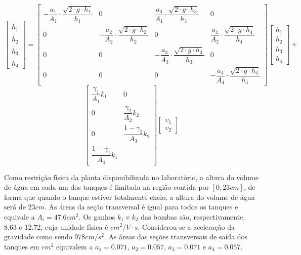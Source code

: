 \begin{example}
\begin{equation*}
\begin{bmatrix}\dot{h_1}\\\dot{h_2}\\\dot{h_3}\\\dot{h_4}\end{bmatrix} = 
\begin{bmatrix}-\dfrac{a_1}{A_1}\cdot \dfrac{\sqrt{2\cdot g \cdot h_1}}{h_1}&0
&\dfrac{a_3}{A_1}\cdot \dfrac{\sqrt{2\cdot g \cdot h_3}}{h_3}&0
\\0&-\dfrac{a_2}{A_2}\cdot \dfrac{\sqrt{2\cdot g \cdot h_2}}{h_2}
&0&\dfrac{a_4}{A_2}\cdot \dfrac{\sqrt{2\cdot g \cdot h_4}}{h_4}
\\0&0&-\dfrac{a_3}{A_3}\cdot \dfrac{\sqrt{2\cdot g \cdot h_3}}{h_3}&0
\\0&0&0&-\dfrac{a_4}{A_4}\cdot \dfrac{\sqrt{2\cdot g \cdot h_4}}{h_4}\end{bmatrix}
\begin{bmatrix}h_1\\h_2\\h_3\\h_4\end{bmatrix}+\end{equation*}
\begin{equation}\label{eq:4tanques_matrix}
\begin{bmatrix}\dfrac{\gamma_1}{A_1}k_1&0\\0&\dfrac{\gamma_2}{A_2}k_2
\\0&\dfrac{1 - \gamma_2}{A_3}k_2\\\dfrac{1 - \gamma_1}{A_4}k_1\end{bmatrix}
\begin{bmatrix}\upsilon_1\\\upsilon_2\end{bmatrix}
\end{equation}

Como restrição física da planta disponibilizada no laboratório, a altura do volume de água em cada um dos tanques é limitada na região contida por $[0, 23 cm]$, de forma que quando o tanque estiver totalmente cheio, a altura do volume de água será de $23 cm$. As áreas da seção transversal é igual para todos os tanques e equivale a $A_i = 47.6 cm^2$. Os ganhos $k_1$ e $k_2$ das bombas são, respectivamente, 8.63 e 12.72, cuja unidade física é $cm^2/ V \cdot s$. Considerou-se a aceleração da gravidade como sendo $978 cm/s^2$. As áreas das seções transversais de saída dos tanques em $cm^2$ equivalem a $a_1 = 0.071$, $a_2 = 0.057$, $a_3 = 0.071$ e $a_4 = 0.057$.
\label{example_4tanques}
\end{example}

